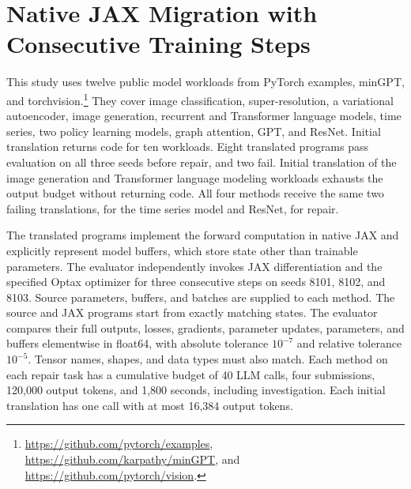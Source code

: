 \section{Native JAX Migration with Consecutive Training Steps}
\label{sec:native-jax-study}
This study uses twelve public model workloads from PyTorch examples, minGPT, and torchvision.\footnote{\url{https://github.com/pytorch/examples}, \url{https://github.com/karpathy/minGPT}, and \url{https://github.com/pytorch/vision}.} They cover image classification, super-resolution, a variational autoencoder, image generation, recurrent and Transformer language models, time series, two policy learning models, graph attention, GPT, and ResNet. Initial translation returns code for ten workloads. Eight translated programs pass evaluation on all three seeds before repair, and two fail. Initial translation of the image generation and Transformer language modeling workloads exhausts the output budget without returning code. All four methods receive the same two failing translations, for the time series model and ResNet, for repair.
\begin{table}[!htb]
\caption{Repair of two failing native JAX translations from twelve source workloads. Calls and Tokens cover repair. Two tasks and All sources report total tokens including 0.031 and 0.140 million shared initial translation tokens, respectively, counted once. Each method accepts 1/2 repair tasks and 9/12 source workloads overall. Tokens are in millions.}
\label{tab:native-jax}
\centering
\small
\setlength{\tabcolsep}{3pt}

\end{table}
The translated programs implement the forward computation in native JAX and explicitly represent model buffers, which store state other than trainable parameters. The evaluator independently invokes JAX differentiation and the specified Optax optimizer for three consecutive steps on seeds 8101, 8102, and 8103. Source parameters, buffers, and batches are supplied to each method. The source and JAX programs start from exactly matching states. The evaluator compares their full outputs, losses, gradients, parameter updates, parameters, and buffers elementwise in float64, with absolute tolerance $10^{-7}$ and relative tolerance $10^{-5}$. Tensor names, shapes, and data types must also match. Each method on each repair task has a cumulative budget of 40 LLM calls, four submissions, 120,000 output tokens, and 1,800 seconds, including investigation. Each initial translation has one call with at most 16,384 output tokens.

